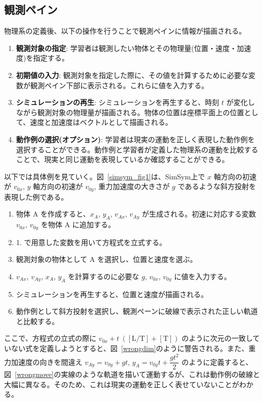 \documentclass[11pt, a4paper, oneside, twocolumn, dvipdfmx]{jsarticle}
\newcommand{\simname}{SimSym}
\begin{document}
\subsection*{観測ペイン}

物理系の定義後、以下の操作を行うことで観測ペインに情報が描画される。

\begin{enumerate}[resume]
\item \textbf{観測対象の指定}: 学習者は観測したい物体とその物理量(位置・速度・加速度)を指定する。
\item \textbf{初期値の入力}: 観測対象を指定した際に、その値を計算するために必要な変数が観測ペイン下部に表示される。これらに値を入力する。
\item \textbf{シミュレーションの再生}: シミュレーションを再生すると、時刻 $t$ が変化しながら観測対象の物理量が描画される。物体の位置は座標平面上の位置として、速度と加速度はベクトルとして描画される。
\item \textbf{動作例の選択(オプション)}: 学習者は現実の運動を正しく表現した動作例を選択することができる。動作例と学習者が定義した物理系の運動を比較することで、現実と同じ運動を表現しているか確認することができる。
\end{enumerate}

以下では具体例を見ていく。図~\ref{simsym_fig1}は、\simname 上で $x$ 軸方向の初速が $v_{0x}$, $y$ 軸方向の初速が $v_{0y}$, 重力加速度の大きさが $g$ であるような斜方投射を表現した例である。
\begin{enumerate}
\item 物体 A を作成すると、$x_A$, $y_A$, $v_{Ax}$, $v_{Ay}$ が生成される。初速に対応する変数 $v_{0x}$, $v_{0y}$ を物体 A に追加する。
\item 1. で用意した変数を用いて方程式を立式する。
\item 観測対象の物体として A を選択し、位置と速度を選ぶ。
\item $v_{Ax}$, $v_{Ay}$, $x_A$, $y_A$ を計算するのに必要な $g$, $v_{0x}$, $v_{0y}$ に値を入力する。
\item シミュレーションを再生すると、位置と速度が描画される。
\item 動作例として斜方投射を選択し、観測ペーンに破線で表示された正しい軌道と比較する。
\end{enumerate}

ここで、方程式の立式の際に $v_{0x} + t ~\mathrm{([L/T] + [T])}$ のように次元の一致していない式を定義しようとすると、図~\ref{wrongdim}のように警告される。また、重力加速度の向きを間違え $v_{Ay} = v_{0y} + gt$, $y_A = v_{0y}t + \dfrac{gt^2}{2}$ のように定義すると、図~\ref{wrongmove}の実線のような軌道を描いて運動するが、これは動作例の破線と大幅に異なる。そのため、これは現実の運動を正しく表せていないことがわかる。
\end{document}
